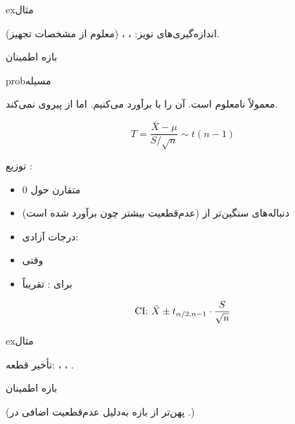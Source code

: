 \begin{PSbox}[unbreakable]{ex}{مثال}

اندازه‌گیری‌های نویز: ، ،  (معلوم از مشخصات تجهیز).

بازه اطمینان 

\end{PSbox}


\begin{PSbox}[unbreakable]{prob}{مسیله}

معمولاً \lr{\ensuremath{\sigma}} نامعلوم است. آن را با  برآورد می‌کنیم. اما  از  پیروی نمی‌کند.

\end{PSbox}


\[T = \frac{\bar{X} - \mu}{S/\sqrt{n}} \sim t(n-1)\]

توزیع :

\begin{itemize}
\tightlist
\item
  متقارن حول 0
\item
  دنباله‌های سنگین‌تر از  (عدم‌قطعیت بیشتر چون  برآورد شده است)
\item
  درجات آزادی: 
\item
  وقتی 
\item
  برای : تقریباً 
\end{itemize}


\[\text{CI: } \bar{X} \pm t_{\alpha/2, n-1} \cdot \frac{S}{\sqrt{n}}\]

\begin{PSbox}[unbreakable]{ex}{مثال}

تأخیر قطعه: ، ، .

بازه اطمینان 


(پهن‌تر از بازه  به‌دلیل عدم‌قطعیت اضافی در .)

\end{PSbox}

